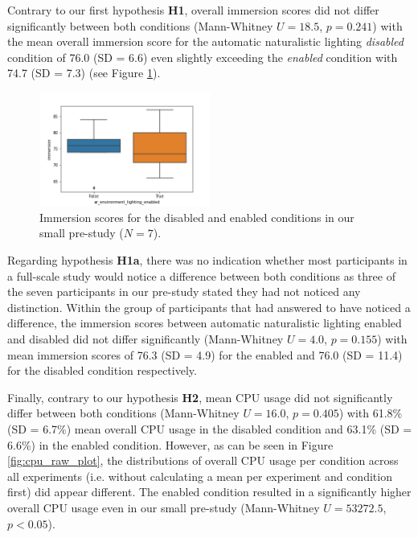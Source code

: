 \documentclass[12pt,twoside,english]{article}
\begin{document}
Contrary to our first hypothesis \textbf{H1}, overall immersion scores did not differ significantly between both conditions (Mann-Whitney $ U = 18.5 $, $ p = 0.241 $) with the mean overall immersion score for the automatic naturalistic lighting \textit{disabled} condition of 76.0 (SD = 6.6) even slightly exceeding the \textit{enabled} condition with 74.7 (SD = 7.3) (see Figure \ref{fig:immersion_plot}).

\begin{figure}[h]
    \centering
    \includegraphics[width=0.5\textwidth]{imgs/immersion_plot}
    \caption{Immersion scores for the disabled and enabled conditions in our small pre-study ($ N = 7 $).}
    \label{fig:immersion_plot}
\end{figure}

Regarding hypothesis \textbf{H1a}, there was no indication whether most participants in a full-scale study would notice a difference between both conditions as three of the seven participants in our pre-study stated they had not noticed any distinction.
Within the group of participants that had answered to have noticed a difference, the immersion scores between automatic naturalistic lighting enabled and disabled did not differ significantly (Mann-Whitney $ U = 4.0 $, $ p = 0.155 $) with mean immersion scores of 76.3 (SD = 4.9) for the enabled and 76.0 (SD = 11.4) for the disabled condition respectively.

Finally, contrary to our hypothesis \textbf{H2}, mean \gls{CPU} usage did not significantly differ between both conditions (Mann-Whitney $ U = 16.0 $, $ p = 0.405 $) with 61.8\% (SD = 6.7\%) mean overall \gls{CPU} usage in the disabled condition and 63.1\% (SD = 6.6\%) in the enabled condition.
However, as can be seen in Figure \ref{fig:cpu_raw_plot}, the distributions of overall \gls{CPU} usage per condition across all experiments (i.e. without calculating a mean per experiment and condition first) did appear different.
The enabled condition resulted in a significantly higher overall \gls{CPU} usage even in our small pre-study (Mann-Whitney $ U = 53272.5 $, $ p < 0.05 $).
\end{document}
